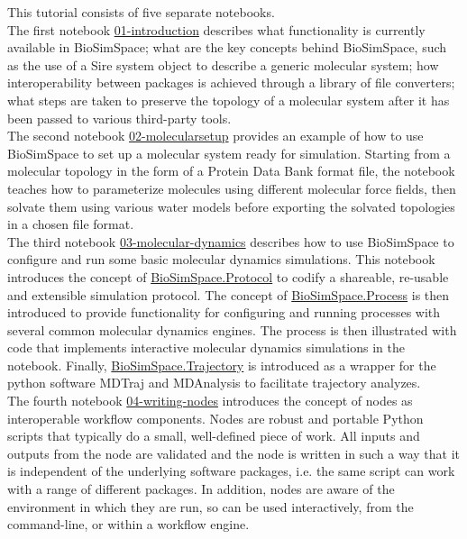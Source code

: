 This tutorial consists of five separate notebooks. 
\\
The first notebook \href{https://github.com/OpenBioSim/biosimspace_tutorials/blob/main/01_introduction/01_introduction.ipynb}{01-introduction} describes what functionality is currently available in BioSimSpace; what are the key concepts behind BioSimSpace, such as the use of a Sire system object to describe a generic molecular system; how interoperability between packages is achieved through a library of file converters;  what steps are taken to preserve the topology of a molecular system after it has been passed to various third-party tools. 
\\
%
The second notebook \href{https://github.com/OpenBioSim/biosimspace_tutorials/blob/main/01_introduction/02_molecular_setup.ipynb}{02-molecularsetup} 
provides an example of how to use BioSimSpace to set up a molecular system ready for simulation. Starting from a molecular topology in the form of a Protein Data Bank format file, the notebook teaches how to parameterize molecules using different molecular force fields, then solvate them using various water models before exporting the solvated topologies in a chosen file format. 
\\
%
The third notebook \href{https://github.com/OpenBioSim/biosimspace_tutorials/blob/main/01_introduction/03_molecular_dynamics.ipynb}{03-molecular-dynamics} describes how to use BioSimSpace to configure and run some basic molecular dynamics simulations. This notebook introduces the concept of \href{https://biosimspace.org/api/index_Protocol.html}{BioSimSpace.Protocol} to codify a shareable, re-usable and extensible simulation protocol. The concept of \href{https://biosimspace.org/api/index_Process.html}{BioSimSpace.Process}
is then introduced to provide functionality for configuring and running processes with several common molecular dynamics engines.  The process is then illustrated with code that implements interactive molecular dynamics simulations in the notebook. Finally, \href{https://biosimspace.openbiosim.org/api/index_Trajectory.html}{BioSimSpace.Trajectory} is introduced as a wrapper for the python software MDTraj and MDAnalysis to facilitate trajectory analyzes. 
\\
%
The fourth notebook \href{https://github.com/OpenBioSim/biosimspace_tutorials/blob/main/01_introduction/04_writing_nodes.ipynb}{04-writing-nodes} introduces the concept of nodes as interoperable workflow components. Nodes are robust and portable Python scripts that typically do a small, well-defined piece of work. All inputs and outputs from the node are validated and the node is written in such a way that it is independent of the underlying software packages, i.e. the same script can work with a range of different packages. In addition, nodes are aware of the environment in which they are run, so can be used interactively, from the command-line, or within a workflow engine. 
